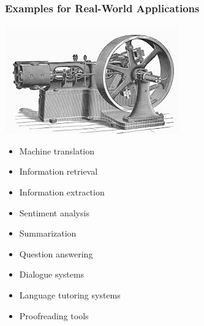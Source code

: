 \documentclass[dvipsnames]{beamer}
\begin{document}
\begin{frame}
\frametitle{Examples for Real-World Applications}
\hfill \includegraphics[scale=0.4]{steam}
\begin{itemize}
\vspace{-2.5cm}
\item Machine translation
\item Information retrieval
\item Information extraction
\item Sentiment analysis
\item Summarization
\item Question answering
\item Dialogue systems
\item Language tutoring systems
\item Proofreading tools
\end{itemize}
\end{frame}
\end{document}
